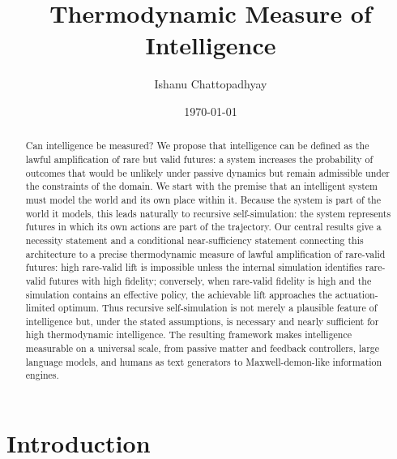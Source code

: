 \documentclass[
  aps,
  prresearch,
  reprint,
  amsmath,
  amssymb,
  superscriptaddress,
  nofootinbib,
  longbibliography
]{revtex4-2}
\begin{document}
\title{Thermodynamic Measure of Intelligence}

\author{Ishanu Chattopadhyay}

\date{\today}

\begin{abstract}
Can intelligence be measured? We propose that intelligence can be defined as the lawful amplification of rare but valid futures: a system increases the probability of outcomes that would be unlikely under passive dynamics but remain admissible under the constraints of the domain. We start with the premise  that an intelligent system must model the world and its own place within it. Because the system is part of the world it models, this leads naturally to recursive self-simulation: the system represents futures in which its own actions are part of the trajectory. Our central results give a necessity statement and a conditional near-sufficiency statement connecting this architecture to a precise thermodynamic measure of lawful amplification of rare-valid futures: high rare-valid lift is impossible unless the internal simulation identifies rare-valid futures with high fidelity; conversely, when rare-valid fidelity is high and the simulation contains an effective policy, the achievable lift approaches the actuation-limited optimum. Thus recursive self-simulation is not merely a plausible feature of intelligence but, under the stated assumptions, is necessary and nearly sufficient for high thermodynamic intelligence. The resulting framework makes intelligence measurable on a universal scale, from passive matter and feedback controllers, large language models, and  humans as text generators to Maxwell-demon-like information engines.
\end{abstract}

\maketitle



\allowdisplaybreaks
\section{Introduction}
\label{sec:introduction}
\end{document}
